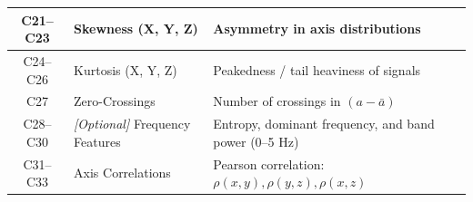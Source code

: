 \documentclass[conference]{IEEEtran}
\begin{document}
\begin{table}
\begin{tabular}{|c|p{4.5cm}|p{6.5cm}|}
\hline
C21--C23 & Skewness (X, Y, Z) & 
Asymmetry in axis distributions \\
\hline
C24--C26 & Kurtosis (X, Y, Z) & 
Peakedness / tail heaviness of signals \\
\hline
C27 & Zero-Crossings & 
Number of crossings in $(a - \bar{a})$ \\
\hline
C28--C30 & \textit{[Optional]} Frequency Features & 
Entropy, dominant frequency, and band power (0--5 Hz) \\
\hline
C31--C33 & Axis Correlations & 
Pearson correlation: $\rho(x,y), \rho(y,z), \rho(x,z)$ \\
\hline
\end{tabular}
\label{tab:features-summary}
\end{table}

\end{document}
